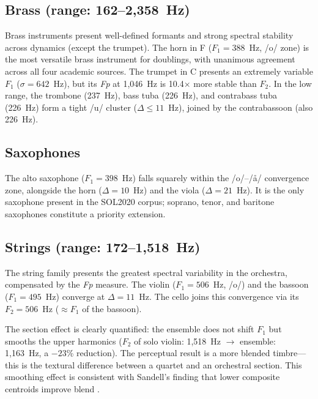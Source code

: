 \documentclass[12pt,a4paper]{article}
\begin{document}
\subsection{Brass (range: 162--2,358~Hz)}

Brass instruments present well-defined formants and strong spectral stability
across dynamics (except the trumpet). The horn in F ($F_1 = 388$~Hz, /o/ zone)
is the most versatile brass instrument for doublings, with unanimous agreement
across all four academic sources. The trumpet in C presents an extremely
variable $F_1$ ($\sigma = 642$~Hz), but its \textit{Fp} at 1,046~Hz is
10.4$\times$ more stable than $F_2$. In the low range, the trombone (237~Hz),
bass tuba (226~Hz), and contrabass tuba (226~Hz) form a tight /u/ cluster
($\Delta \leq 11$~Hz), joined by the contrabassoon (also 226~Hz).

\subsection{Saxophones}

The alto saxophone ($F_1 = 398$~Hz) falls squarely within the /o/--/\aa/
convergence zone, alongside the horn ($\Delta = 10$~Hz) and the viola
($\Delta = 21$~Hz). It is the only saxophone present in the SOL2020 corpus;
soprano, tenor, and baritone saxophones constitute a priority extension.

\subsection{Strings (range: 172--1,518~Hz)}

The string family presents the greatest spectral variability in the orchestra,
compensated by the \textit{Fp} measure. The violin ($F_1 = 506$~Hz, /o/) and
the bassoon ($F_1 = 495$~Hz) converge at $\Delta = 11$~Hz. The cello joins
this convergence via its $F_2 = 506$~Hz ($\approx F_1$ of the bassoon).

The section effect is clearly quantified: the ensemble does not shift $F_1$
but smooths the upper harmonics ($F_2$ of solo violin: 1,518~Hz $\rightarrow$
ensemble: 1,163~Hz, a $-23$\% reduction). The perceptual result is a more
blended timbre---this is the textural difference between a quartet and an
orchestral section. This smoothing effect is consistent with Sandell's finding
that lower composite centroids improve blend \citep{Sandell1995}.

\end{document}

